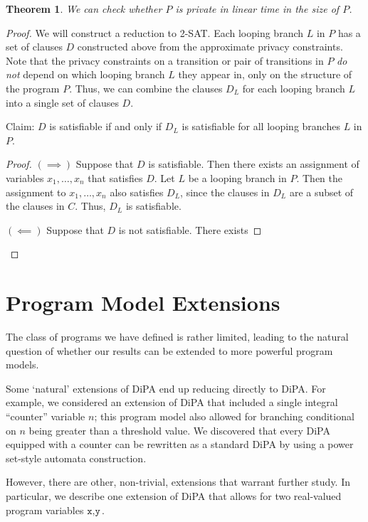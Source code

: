 \documentclass[12pt]{article}
\newtheorem{thm}{Theorem}[section]
\theoremstyle{definition}
\begin{document}
\begin{thm}
    We can check whether $P$ is private in linear time in the size of $P$.
\end{thm}

\begin{proof}
    We will construct a reduction to 2-SAT. Each looping branch $L$ in $P$ has a set of clauses $D$ constructed above from the approximate privacy constraints. Note that the privacy constraints on a transition or pair of transitions in $P$ \textit{do not} depend on which looping branch $L$ they appear in, only on the structure of the program $P$. Thus, we can combine the clauses $D_L$ for each looping branch $L$ into a single set of clauses $D$.
    
    Claim: $D$ is satisfiable if and only if $D_L$ is satisfiable for all looping branches $L$ in $P$. 

    \begin{proof}
        $(\implies)$ Suppose that $D$ is satisfiable. Then there exists an assignment of variables $x_1, \dots, x_n$ that satisfies $D$. Let $L$ be a looping branch in $P$. Then the assignment to $x_1, \dots, x_n$ also satisfies $D_L$, since the clauses in $D_L$ are a subset of the clauses in $C$. Thus, $D_L$ is satisfiable.

        $(\impliedby)$ Suppose that $D$ is not satisfiable. There exists 
    \end{proof}
\end{proof}

\section{Program Model Extensions}

The class of programs we have defined is rather limited, leading to the natural question of whether our results can be extended to more powerful program models. 

Some `natural' extensions of DiPA end up reducing directly to DiPA. For example, we considered an extension of DiPA that included a single integral ``counter'' variable $n$; this program model also allowed for branching conditional on $n$ being greater than a threshold value. 
We discovered that every DiPA equipped with a counter can be rewritten as a standard DiPA by using a power set-style automata construction. 

However, there are other, non-trivial, extensions that warrant further study. In particular, we describe one extension of DiPA that allows for two real-valued program variables $\texttt{x}, \texttt{y}$.
\end{document}
